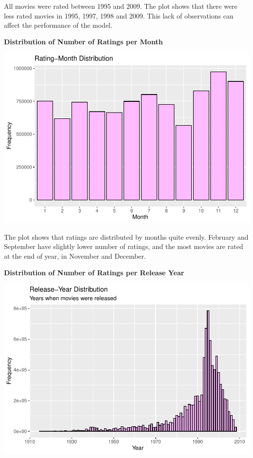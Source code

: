 \documentclass[
]{article}
\begin{document}
All movies were rated between 1995 and 2009. The plot shows that there
were less rated movies in 1995, 1997, 1998 and 2009. This lack of
observations can affect the performance of the model.

\newpage

\textbf{Distribution of Number of Ratings per Month}

\begin{center}\includegraphics{MovieLens-Report_MitjaPrah_files/figure-latex/unnamed-chunk-24-1} \end{center}

The plot shows that ratings are distributed by months quite evenly.
February and September have slightly lower number of ratings, and the
most movies are rated at the end of year, in November and December.

\newpage

\textbf{Distribution of Number of Ratings per Release Year}

\begin{center}\includegraphics{MovieLens-Report_MitjaPrah_files/figure-latex/unnamed-chunk-25-1} \end{center}
\end{document}
